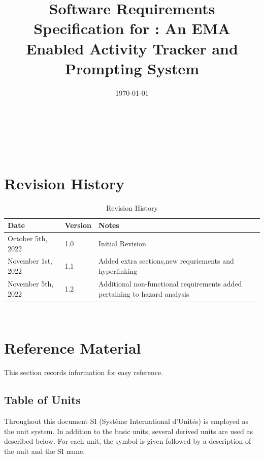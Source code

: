 \documentclass[12pt]{article}
\begin{document}
\title{Software Requirements Specification for \progname: An EMA Enabled Activity Tracker and Prompting System}
\author{\authname}
\date{\today}

\maketitle

~\newpage


\tableofcontents
\listoffigures
\listoftables
~\newpage

\section*{Revision History}

\begin{table}[H]
	\begin{tabularx}{\textwidth}{p{4cm}p{2cm}X}
	  \toprule {\bf Date} 		  & {\bf Version}	 & {\bf Notes} \\
	  \midrule
	  October 5th, 2022              & 1.0           		& Initial Revision       \\
	  November 1st, 2022		  & 1.1           		& Added extra sections,new requriements and hyperlinking\\   
	  November 5th, 2022           & 1.2                       & Additional non-functional requirements added pertaining to hazard analysis\\
	  \bottomrule
	\end{tabularx}
	\caption{\label{revHist}Revision History}
\end{table}
~\newpage
\pagebreak
\section{Reference Material}
\label{Ref_Material}
This section records information for easy reference.

\subsection{Table of Units}

Throughout this document SI (Syst\`{e}me International d'Unit\'{e}s) is employed
as the unit system.  In addition to the basic units, several derived units are
used as described below.  For each unit, the symbol is given followed by a
description of the unit and the SI name.
~\newline
\end{document}
